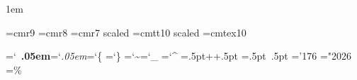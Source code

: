 

\let\:=\. %

\parskip 0pt %
\parindent 1em %

\font\ninerm=cmr9
\let\mc=\ninerm %
\def\Cee{{\mc C\spacefactor1000}}
\def\UNIX{{\mc UNIX\spacefactor1000}}
\font\eightrm=cmr8
\let\sc=\eightrm %
\let\mainfont=\tenrm
\font\titlefont=cmr7 scaled %
\font\ttitlefont=cmtt10 scaled %
\font\tentex=cmtex10 %
\tentex=0pt %

\def\\#1{\leavevmode\hbox{\it#1\/\kern.05em}} %
\def\|#1{\leavevmode\hbox{$#1$}} %
\def\&#1{\leavevmode\hbox{\bf
  \def\_{\kern.04em\vbox{\hrule width.3em height .6pt}\kern.08em}%
  #1\/\kern.05em}} %
\def\.#1{\leavevmode\hbox{\tentex %
  \let\\=\BS %
  \let\{=\LB %
  \let\}=\RB %
  \let\~=\TL %
  \let\ =\SP %
  \let\_=\UL %
  \let\&=\AM %
  \let\^=\CF %
  #1\kern.05em}}
\def\){\discretionary{\hbox{\tentex\BS}}{}{}}
\def\AT{@} %

\chardef\AM=`\& %
\chardef\BS=`\\ %
\chardef\LB=`\{ %
\chardef\RB=`\} %
\def\SP{{\tt\char`\ }} %
\chardef\TL=`\~ %
\chardef\UL=`\_ %
\chardef\CF=`\^ %

\newbox\PPbox %
\setbox\PPbox=\hbox{\kern.5pt\hbox{\sevenrm+\kern-1pt+}\kern.5pt}
\def\PP{\copy\PPbox}
\newbox\MMbox \setbox\MMbox=\hbox{\kern.5pt\hbox{\sevensy{}
 \kern-1pt}\kern.5pt}
\def\MM{\copy\MMbox}
\newbox\MGbox %
\setbox\MGbox=\hbox{\kern-2pt\hbox{\teni\char'176}\kern1pt}
\def\MG{\copy\MGbox}
\let\GG=\gg
\let\LL=\ll
\let\NULL=\Lambda
\mathchardef\AND="2026 %
\let\OR=\mid %
\let\XOR=\oplus %
\def\CM{{\sim}} %
\newbox\MODbox \setbox\MODbox=\hbox{\eightrm\%}
\def\MOD{\mathbin{\copy\MODbox}}


